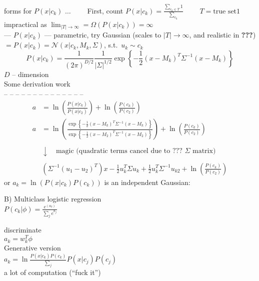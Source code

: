 \newpage

forms for $P(x|c_k)$ $\ldots\qquad$ First, count $P(x|c_k)= \frac{\sum_{c_k\in T}1}{\sum_{c_k}}$ $\qquad T=\text{true\ set}1$\\

impractical as $\lim_{|T|\to\infty}=\Omega\left( P(x|c_k) \right) = \infty$\\

--- $P(x|c_k)$ --- parametric, try Gaussian (scales to $|T|\to\infty$, and realistic in \textbf{???})\\
$=P(x|c_k)=\mathcal{N}( x|c_k, M_k, \Sigma )$, s.t.\ $u_k \sim c_k$
\begin{equation*}
P(x|c_k) = \frac{1}{(2\pi)^{D/2}}\frac{1}{|\Sigma|^{1/2}}\exp\left\{ 
-\frac{1}{2}(x-M_k)^{T}\Sigma^{-1}(x-M_k) \right\}
\end{equation*}
$D$ -- dimension\\

Some derivation work\\
-- -- -- -- -- -- -- -- -- -- -- -- -- --\\

\begin{align*}
a & = \ln\left( \frac{P(x|c_k)}{P(x|c_2)} \right) + \ln\left( \frac{P(c_k)}{P(c_2)} \right) \\
a & = \ln\left( \frac{\exp\left\{ -\frac{1}{2} ( x-M_k )^{T}\Sigma^{-1} ( x-M_k ) \right\}}{\exp\left\{ -\frac{1}{2} ( x-M_2 )^{T}\Sigma^{-1} ( x-M_2  ) \right\}} \right) + \ln\left( \frac{P(c_k)}{P(c_2)} \right) \\
\\
&\downarrow\quad\text{magic (quadratic\ terms\ cancel\ due\ to\ ???\ }\Sigma\text{\ matrix)} \\
\\
& \left( \Sigma^{-1}(u_1-u_2)^{T}\right)x - \frac{1}{2}u_{k}^{T}\Sigma u_{k} + \frac{1}{2}u_{k}^{T}\Sigma^{-1}u_{k2} + \ln\left( \frac{P(c_k)}{P(c_2)}\right)
\end{align*}
or $a_k = \ln\left( P(x|c_k)P(c_k)\right)$ is an independent Gaussian:

\newpage

B) Multiclass logistic regression\\

$P( c_k | \phi ) = \frac{e^{(a_k)}}{\sum_j e^{a_j}}$

discriminate\\
$a_k=w_k^T\phi$\\

Generative version\\
$a_k=\ln\frac{P(x|c_k)P(c_k)}{\sum_j}P(x|c_j)P(c_j)$\\
a lot of computation (``fuck it'')\\

